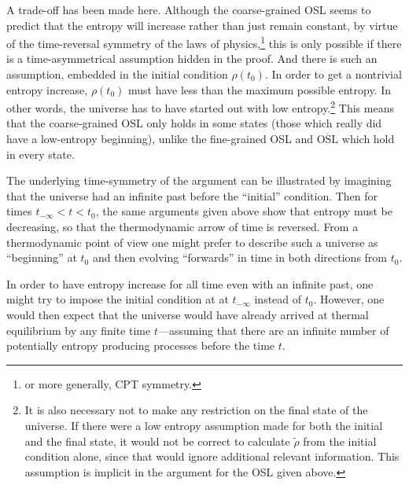 \documentclass[12pt]{article}
\begin{document}
A trade-off has been made here.  Although the coarse-grained OSL seems to predict that the entropy will increase rather than just remain constant, by virtue of the time-reversal symmetry of the laws of physics,\footnote{or more generally, CPT symmetry.} this is only possible if there is a time-asymmetrical assumption hidden in the proof.  And there is such an assumption, embedded in the initial condition $\rho(t_0)$.  In order to get a nontrivial entropy increase, $\rho(t_0)$ must have less than the maximum possible entropy.  In other words, the universe has to have started out with low entropy.\footnote{It is also necessary not to make any restriction on the final state of the universe.  If there were a low entropy assumption made for both the initial and the final state, it would not be correct to calculate $\tilde{\rho}$ from the initial condition alone, since that would ignore additional relevant information.  This assumption is implicit in the argument for the OSL given above.}  This means that the coarse-grained OSL only holds in some states (those which really did have a low-entropy beginning), unlike the fine-grained OSL and $\overline{\mathrm{OSL}}$ which hold in every state.

The underlying time-symmetry of the argument can be illustrated by imagining that the universe had an infinite past before the ``initial'' condition.  Then for times $t_{-\infty} < t < t_0$, the same arguments given above show that entropy must be decreasing, so that the thermodynamic arrow of time is reversed.  From a thermodynamic point of view one might prefer to describe such a universe as ``beginning'' at $t_0$ and then evolving ``forwards'' in time in both directions from $t_0$.  

In order to have entropy increase for all time even with an infinite past, one might try to impose the initial condition at at $t_{-\infty}$ instead of $t_0$.  However, one would then expect that the universe would have already arrived at thermal equilibrium by any finite time $t$---assuming that there are an infinite number of potentially entropy producing processes before the time $t$.
\end{document}
